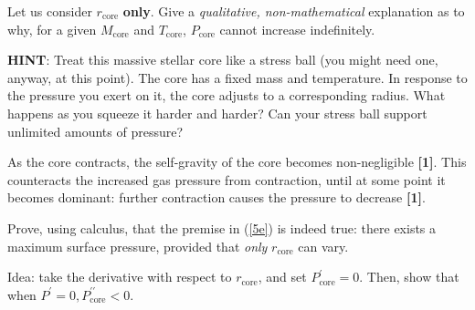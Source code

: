 \documentclass[a4paper,11pt]{exam}
\begin{document}
\begin{questions}
\question[2]\label{5e}
	Let us consider $ r_\text{core} $ \textbf{only}. Give a \textit{qualitative, non-mathematical} explanation as to why, for a given $ M_\text{core} $ and $ T_\text{core} $, $ P_\text{core} $ cannot increase indefinitely.
	\droppoints
	
	\textbf{HINT}: Treat this massive stellar core like a stress ball {\footnotesize (you might need one, anyway, at this point)}. The core has a fixed mass and temperature. In response to the pressure you exert on it, the core adjusts to a corresponding radius. What happens as you squeeze it harder and harder? Can your stress ball support unlimited amounts of pressure?	
	\begin{solution}
		As the core contracts, the self-gravity of the core becomes non-negligible \textbf{[1]}. This counteracts the increased gas pressure from contraction, until at some point it becomes dominant: further contraction causes the pressure to decrease \textbf{[1]}. 
	\end{solution}
	
\question[4]
	Prove, using calculus, that the premise in (\ref{5e}) is indeed true: there exists a maximum surface pressure, provided that \textit{only} $ r_\text{core} $ can vary.
	\droppoints
	\begin{solution}
		Idea: take the derivative with respect to $ r_\text{core} $, and set $ P^{\prime}_\text{core} = 0$. Then, show that when $ P^{\prime} = 0,  P^{\prime\prime}_\text{core} < 0 $.
		

\end{solution}
\end{questions}
\end{document}
